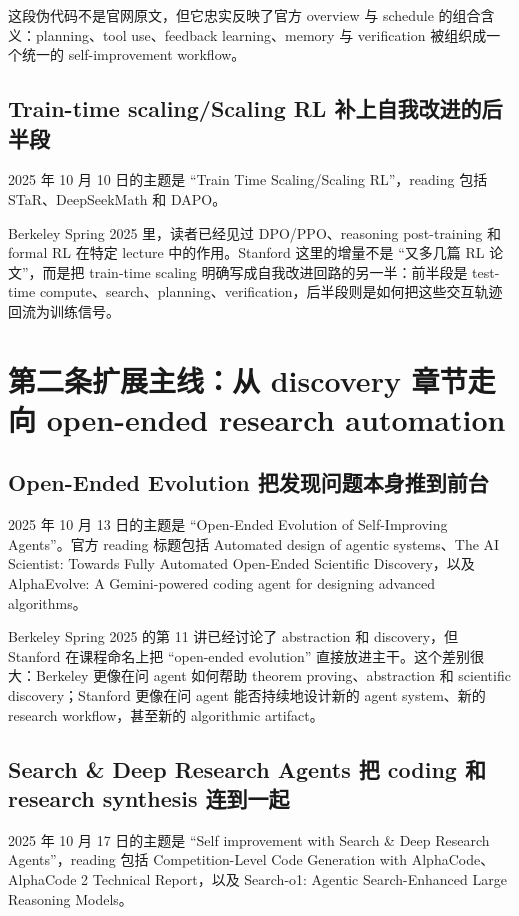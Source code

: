 这段伪代码不是官网原文，但它忠实反映了官方 overview 与 schedule 的组合含义：planning、tool use、feedback learning、memory 与 verification 被组织成一个统一的 self-improvement workflow。

\subsection{Train-time scaling/Scaling RL 补上自我改进的后半段}

2025 年 10 月 10 日的主题是 ``Train Time Scaling/Scaling RL''，reading 包括 STaR、DeepSeekMath 和 DAPO。

Berkeley Spring 2025 里，读者已经见过 DPO/PPO、reasoning post-training 和 formal RL 在特定 lecture 中的作用。Stanford 这里的增量不是 ``又多几篇 RL 论文''，而是把 train-time scaling 明确写成自我改进回路的另一半：前半段是 test-time compute、search、planning、verification，后半段则是如何把这些交互轨迹回流为训练信号。

\section{第二条扩展主线：从 discovery 章节走向 open-ended research automation}

\subsection{Open-Ended Evolution 把发现问题本身推到前台}

2025 年 10 月 13 日的主题是 ``Open-Ended Evolution of Self-Improving Agents''。官方 reading 标题包括 Automated design of agentic systems、The AI Scientist: Towards Fully Automated Open-Ended Scientific Discovery，以及 AlphaEvolve: A Gemini-powered coding agent for designing advanced algorithms。

Berkeley Spring 2025 的第 11 讲已经讨论了 abstraction 和 discovery，但 Stanford 在课程命名上把 ``open-ended evolution'' 直接放进主干。这个差别很大：Berkeley 更像在问 agent 如何帮助 theorem proving、abstraction 和 scientific discovery；Stanford 更像在问 agent 能否持续地设计新的 agent system、新的 research workflow，甚至新的 algorithmic artifact。

\subsection{Search \& Deep Research Agents 把 coding 和 research synthesis 连到一起}

2025 年 10 月 17 日的主题是 ``Self improvement with Search \& Deep Research Agents''，reading 包括 Competition-Level Code Generation with AlphaCode、AlphaCode 2 Technical Report，以及 Search-o1: Agentic Search-Enhanced Large Reasoning Models。

